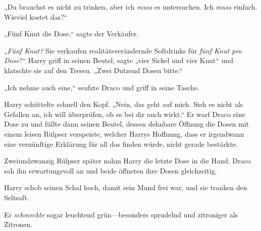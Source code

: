 „Du brauchst es nicht zu trinken, aber ich \emph{muss} es untersuchen. Ich \emph{muss} einfach. Wieviel kostet das?“

„Fünf Knut die Dose,“ sagte der Verkäufer.

„\emph{Fünf Knut?} Sie verkaufen realitätsverändernde Softdrinks für \emph{fünf Knut pro Dose}?“ Harry griff in seinen Beutel, sagte „vier Sickel und vier Knut“ und klatschte sie auf den Tresen. „Zwei Dutzend Dosen bitte.“

„Ich nehme auch eine,“ seufzte Draco und griff in seine Tasche.

Harry schüttelte schnell den Kopf. „Nein, das geht auf mich. Sieh es nicht als Gefallen an, ich will überprüfen, ob es bei dir auch wirkt.“ Er warf Draco eine Dose zu und füllte dann seinen Beutel, dessen dehnbare Öffnung die Dosen mit einem leisen Rülpser verspeiste, welcher Harrys Hoffnung, dass er irgendwann eine vernünftige Erklärung für all das finden würde, nicht gerade bestärkte.

Zweiundzwanzig Rülpser später nahm Harry die letzte Dose in die Hand. Draco sah ihn erwartungsvoll an und beide öffneten ihre Dosen gleichzeitig.

Harry schob seinen Schal hoch, damit sein Mund frei war, und sie tranken den Seltsaft.

Er \emph{schmeckte} sogar leuchtend grün—besonders sprudelnd und zitroniger als Zitronen.

